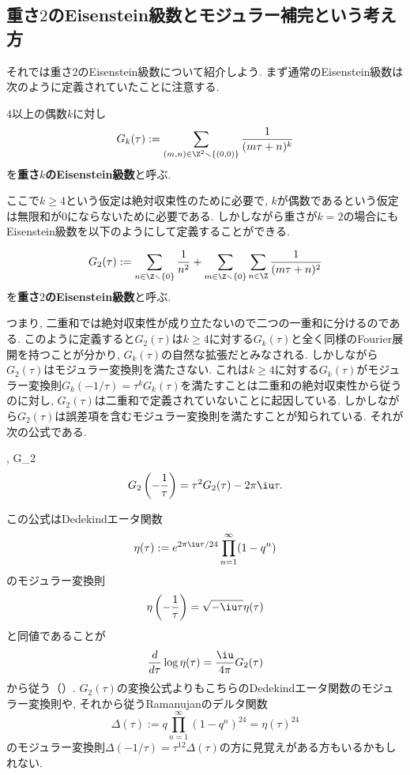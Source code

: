 \documentclass[11pt,b5paper,oneside,lualatex]{ltjsarticle} %
\numberwithin{equation}{section} %
\begin{document}

\subsection{重さ$ 2 $のEisenstein級数とモジュラー補完という考え方} \label{subsec:modular_completion}


それでは重さ$ 2 $のEisenstein級数について紹介しよう. 
まず通常のEisenstein級数は次のように定義されていたことに注意する. 

\begin{dfn}{}{}
	$ 4 $以上の偶数$ k $に対し
	\[
	G_k (\tau) := \sum_{(m, n) \in \Z^2 \smallsetminus \{ (0, 0) \}} \frac{1}{(m\tau + n)^k}
	\]
	を\textbf{重さ$ k $のEisenstein級数}と呼ぶ. 
\end{dfn}

ここで$ k \ge 4 $という仮定は絶対収束性のために必要で, $ k $が偶数であるという仮定は無限和が$ 0 $にならないために必要である. 
しかしながら重さが$ k=2 $の場合にもEisenstein級数を以下のようにして定義することができる. 

\begin{dfn}{}{}
	\[
	G_2 (\tau) := 
	\sum_{n \in \Z \smallsetminus \{ 0 \}} \frac{1}{n^2} 
	+ \sum_{m \in \Z \smallsetminus \{ 0 \}} \sum_{n \in \Z} \frac{1}{(m\tau + n)^2}
	\]
	を\textbf{重さ$ 2 $のEisenstein級数}と呼ぶ. 
\end{dfn}

つまり, 二重和では絶対収束性が成り立たないので二つの一重和に分けるのである. 
このように定義すると$ G_2 (\tau) $は$ k \ge 4 $に対する$ G_k (\tau) $と全く同様のFourier展開を持つことが分かり, $ G_k (\tau) $の自然な拡張だとみなされる. 
しかしながら$ G_2 (\tau) $はモジュラー変換則を満たさない. 
これは$ k \ge 4 $に対する$ G_k (\tau) $がモジュラー変換則$ G_k (-1/\tau) = \tau^k G_k(\tau) $を満たすことは二重和の絶対収束性から従うのに対し, $ G_2 (\tau) $は二重和で定義されていないことに起因している. 
しかしながら$ G_2 (\tau) $は誤差項を含むモジュラー変換則を満たすことが知られている. 
それが次の公式である. 

\begin{prop}{{\cite[pp.~14, Equation (1.4)]{DS}, \cite[pp.~19, Proposition 6]{1-2-3}}}{G_2}
	\[
	G_2 \left( -\frac{1}{\tau} \right) = \tau^2 G_2(\tau) - 2\pi \iu \tau.
	\]
\end{prop}

\begin{rem}{}{}
	この公式はDedekindエータ関数
	\[
	\eta(\tau) := e^{2\pi\iu\tau/24}
	\prod_{n=1}^{\infty} (1-q^n)
	\]
	のモジュラー変換則
	\[
	\eta \left( -\frac{1}{\tau} \right)
	=
	\sqrt{-\iu \tau} \eta (\tau)
	\]
	と同値であることが
	\[
	\frac{d}{d\tau} \log \eta(\tau)
	=
	\frac{\iu}{4\pi} G_2(\tau)
	\]
	から従う（\cite[Proposition 1.2.5]{DS}）. 
	$ G_2 (\tau) $の変換公式よりもこちらのDedekindエータ関数のモジュラー変換則や, それから従うRamanujanのデルタ関数
	\[
	\Delta(\tau) := q \prod_{n=1}^{\infty} (1-q^n)^{24}
	= \eta(\tau)^{24}
	\]
	のモジュラー変換則$ \Delta(-1/\tau) = \tau^{12} \Delta(\tau) $の方に見覚えがある方もいるかもしれない. 
\end{rem}
\end{document}

